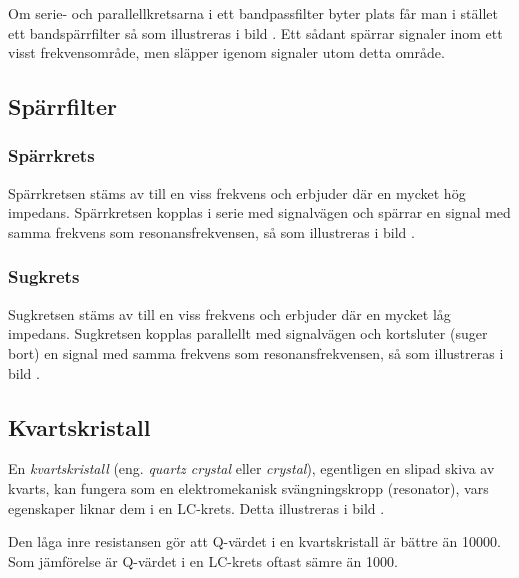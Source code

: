 Om serie- och parallellkretsarna i ett bandpassfilter byter plats får man
i stället ett bandspärrfilter så som illustreras i bild .
Ett sådant spärrar signaler inom ett visst frekvensområde, men släpper igenom
signaler utom detta område.

\newpage
\subsection{Spärrfilter}


\subsubsection{Spärrkrets}
Spärrkretsen stäms av till en viss frekvens och erbjuder där en mycket hög
impedans.
Spärrkretsen kopplas i serie med signalvägen och spärrar en signal med samma
frekvens som resonansfrekvensen, så som illustreras i bild .

\subsubsection{Sugkrets}
Sugkretsen stäms av till en viss frekvens och erbjuder där en mycket låg
impedans.
Sugkretsen kopplas parallellt med signalvägen och kortsluter (suger bort) en
signal med samma frekvens som resonansfrekvensen, så som illustreras i bild
.


\subsection{Kvartskristall}



En \emph{kvartskristall} (eng. \emph{quartz crystal} eller \emph{crystal}),
egentligen en slipad skiva av kvarts, kan fungera som en
elektromekanisk svängningskropp (resonator), vars egenskaper liknar dem i en
LC-krets.
Detta illustreras i bild .

Den låga inre resistansen gör att Q-värdet i en kvartskristall är bättre än
10000.
Som jämförelse är Q-värdet i en LC-krets oftast sämre än 1000.

